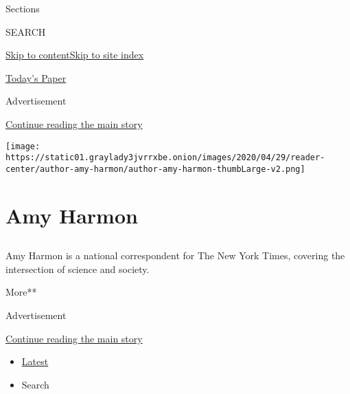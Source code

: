 Sections

SEARCH

\protect\hyperlink{site-content}{Skip to
content}\protect\hyperlink{site-index}{Skip to site index}

\href{https://myaccount.nytimes3xbfgragh.onion/auth/login?response_type=cookie\&client_id=vi}{}

\href{https://www.nytimes3xbfgragh.onion/section/todayspaper}{Today's
Paper}

Advertisement

\protect\hyperlink{after-top}{Continue reading the main story}

\texttt{[image: https://static01.graylady3jvrrxbe.onion/images/2020/04/29/reader-center/author-amy-harmon/author-amy-harmon-thumbLarge-v2.png]}

\hypertarget{amy-harmon}{%
\section{Amy Harmon}\label{amy-harmon}}

\subsection{}

Amy Harmon is a national correspondent for The New York Times, covering
the intersection of science and society.

More**

Advertisement

\protect\hyperlink{after-mid1}{Continue reading the main story}

\begin{itemize}
\tightlist
\item
  \protect\hyperlink{stream-panel}{Latest}
\item
  Search
\end{itemize}

